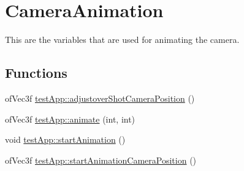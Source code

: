 \hypertarget{group___camera_animation}{\section{Camera\-Animation}
\label{group___camera_animation}
}


This are the variables that are used for animating the camera.  


\subsection*{Functions}
\begin{DoxyCompactItemize}
\item 
of\-Vec3f \hyperlink{group___camera_animation_ga2a792bfdf269fd69951cbf97d4f574af}{test\-App\-::adjustover\-Shot\-Camera\-Position} ()
\item 
of\-Vec3f \hyperlink{group___camera_animation_ga1facfe2200dae7ad147b8f9ab31f68c6}{test\-App\-::animate} (int, int)
\item 
void \hyperlink{group___camera_animation_ga79467453f6ea0dd63961a810dca9ac6a}{test\-App\-::start\-Animation} ()
\item 
of\-Vec3f \hyperlink{group___camera_animation_ga1a97063e992528dc79867e516d9365f0}{test\-App\-::start\-Animation\-Camera\-Position} ()
\end{DoxyCompactItemize}
